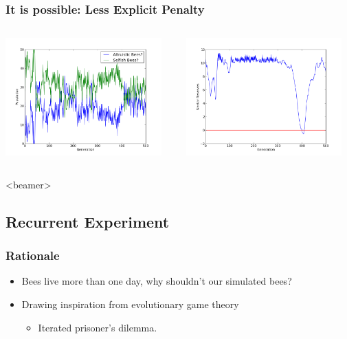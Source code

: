 \documentclass{beamer}
\begin{document}
      \begin{frame}[c]\frametitle{It is possible: Less Explicit Penalty}
        \begin{columns}
        \begin{column}{0.48\textwidth}
          \includegraphics[width=6cm]{results/selfish_modify.png}
        \end{column}
        \begin{column}{0.48\textwidth}
          \includegraphics[width=6cm]{results/selfish_modify_nectar.png}
        \end{column}
        \end{columns}
      \end{frame}

    \setcounter{tocdepth}{2}
      \begin{frame}<beamer>
      \end{frame}
    \setcounter{tocdepth}{3}

    \subsection{Recurrent Experiment} %
    \label{sub:recurrent_experiment}
    
      \begin{frame}[c]\frametitle{Rationale}
        \begin{itemize}
          \item Bees live more than one day, why shouldn't our simulated bees?
          \item Drawing inspiration from evolutionary game theory
          \begin{itemize}
            \item Iterated prisoner's dilemma.
          \end{itemize}
        \end{itemize}
      \end{frame}
\end{document}
